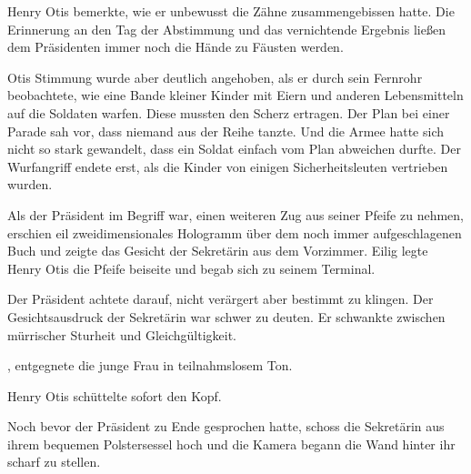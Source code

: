 \par

Henry Otis bemerkte, wie er unbewusst die Zähne zusammengebissen hatte. Die Erinnerung an den Tag der Abstimmung und das vernichtende Ergebnis ließen dem Präsidenten immer noch die Hände zu Fäusten werden.

\par

Otis Stimmung wurde aber deutlich angehoben, als er durch sein Fernrohr beobachtete, wie eine Bande kleiner Kinder mit Eiern und anderen Lebensmitteln auf die Soldaten warfen. Diese mussten den Scherz ertragen. Der Plan bei einer Parade sah vor, dass niemand aus der Reihe tanzte. Und die Armee hatte sich nicht so stark gewandelt, dass ein Soldat einfach vom Plan abweichen durfte. Der Wurfangriff endete erst, als die Kinder von einigen Sicherheitsleuten vertrieben wurden.

\par

Als der Präsident im Begriff war, einen weiteren Zug aus seiner Pfeife zu nehmen, erschien eil zweidimensionales Hologramm über dem noch immer aufgeschlagenen Buch und zeigte das Gesicht der Sekretärin aus dem Vorzimmer. Eilig legte Henry Otis die Pfeife beiseite und begab sich zu seinem Terminal.

\par

 Der Präsident achtete darauf, nicht verärgert aber bestimmt zu klingen. Der Gesichtsausdruck der Sekretärin war schwer zu deuten. Er schwankte zwischen mürrischer Sturheit und Gleichgültigkeit.

\par

, entgegnete die junge Frau in teilnahmslosem Ton.

\par

Henry Otis schüttelte sofort den Kopf. 

\par

Noch bevor der Präsident zu Ende gesprochen hatte, schoss die Sekretärin aus ihrem bequemen Polstersessel hoch und die Kamera begann die Wand hinter ihr scharf zu stellen.

\par

